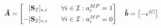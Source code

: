 \begin{equation*}
    \boldsymbol{\tilde{A}} = 
    \left[\begin{aligned}
        & [\bold S_{\mathcal{I}}]_{*,i} \quad &\forall i \in \mathcal{I}: a_i^{MP} = 1\\
        - & [\bold S_{\mathcal{I}}]_{*,i} \quad &\forall i \in \mathcal{I}: a_i^{MP} = 0\\
    \end{aligned}\right]  
    \quad \boldsymbol{\tilde{b}} = \left[\begin{aligned}
        -&\epsilon^{|\mathcal{C}|} \\
    \end{aligned}\right]
\end{equation*} 




